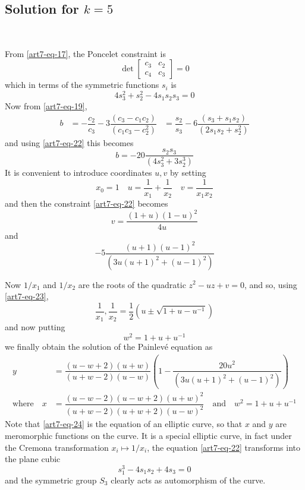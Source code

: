 \subsection{Solution for $k=5$}\label{art7-subsec-6.3}
~

\noindent
From \eqref{art7-eq-17}, the Poncelet constraint is
$$
\det
\begin{bmatrix}
c_{3} & c_{2}\\
c_{4} & c_{3}
\end{bmatrix}
=0
$$
which in terms of the symmetric functions $s_{i}$ is
\begin{equation}\label{art7-eq-22}
4s_{3}^{2} +s_{2}^{2} - 4s_{1}s_{2}s_{3} =0
\end{equation}
Now from \eqref{art7-eq-19},
\begin{align*}
b &= -\dfrac{c_{2}}{c_{3}} -3 \dfrac{(c_{3}-c_{1}c_{2})}{(c_{1}c_{3}-c_{2}^{2})}
 &=\dfrac{s_{2}}{s_{3}} -6\dfrac{(s_{3}+s_{1}s_{2})}{(2s_{1}s_{2}+s_{2}^{2})}
\end{align*}
and using \eqref{art7-eq-22} this becomes
$$
b =-20 \dfrac{s_{2}s_{3}}{(4s_{3}^{2} + 3s_{2}^{3})}
$$
It is convenient to introduce coordinates $u, v$ by setting
$$
x_{0}=1 \quad  u=\dfrac{1}{x_{1}} + \dfrac{1}{x_{2}} \quad v= \dfrac{1}{x_{1}x_{2}}
$$
and then the constraint \eqref{art7-eq-22} becomes
\begin{equation}\label{art7-eq-23}
v = \dfrac{(1+u)(1-u)^{2}}{4u}
\end{equation}
and
$$
-5\dfrac{(u+1)(u-1)^{2}}{(3u(u+1)^{2} + (u-1)^{2})}
$$

Now $1/x_{1}$ and $1/x_{2}$ are the roots of the quadratic $z^{2}-uz +v =0$, and so, using \eqref{art7-eq-23},
$$
\dfrac{1}{x_{1}}, \dfrac{1}{x_{2}} = \dfrac{1}{2}(u \pm \sqrt{1+u-u^{-1}})
$$
and now putting
\begin{equation}\label{art7-eq-24}
w^{2} = 1+u +u^{-1}
\end{equation}
we finally obtain the solution of the Painlev\'e equation as
\begin{align*}
y &=  \dfrac{(u-w+2)(u+w)}{(u+w-2)(u-w)} \left(1- \dfrac{20u^{2}}{(3u(u+1)^{2} + (u-1)^{2})} \right)\\
\text{where} \quad x &= \dfrac{(u-w-2)(u-w+2)(u+w)^{2}}{(u+w-2)(u+w+2)(u-w)^{2}}\quad \text{and} \quad w^{2}=1+u+u^{-1}
\end{align*}
Note that \eqref{art7-eq-24} is the equation of an elliptic curve, so that $x$ and $y$ are meromorphic functions on the curve. It is a special elliptic curve, in fact under the Cremona transformation $x_{i}\mapsto 1/x_{i}$, the equation \eqref{art7-eq-22} transforms into the plane cubic
$$
s_{1}^{3}-4s_{1}s_{2}+4s_{3} =0
$$
and the symmetric group $S_{3}$ clearly acts as automorphism of the curve.

